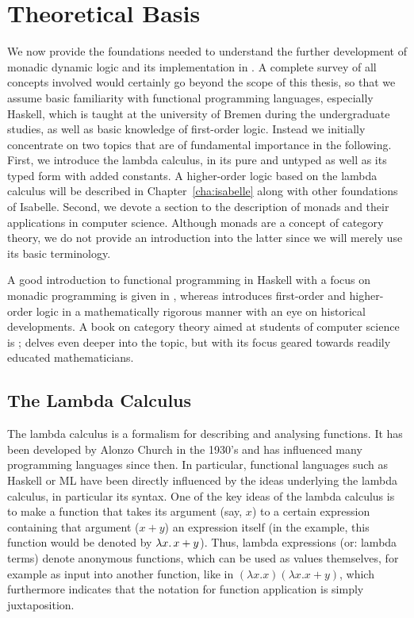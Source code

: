 
\chapter{Theoretical Basis}
\label{cha:theoret-basis}

We now provide the foundations needed to understand the further development of
monadic dynamic logic and its implementation in \IsabelleHOL. A complete survey
of all concepts involved would certainly go beyond the scope of this thesis, so
that we assume basic familiarity with functional programming languages,
especially Haskell, which is taught at the university of Bremen during the
undergraduate studies, as well as basic knowledge of first-order logic. Instead
we initially concentrate on two topics that are of fundamental importance in the
following. First, we introduce the lambda calculus, in its pure and untyped as
well as its typed form with added constants. A higher-order logic based on the
lambda calculus will be described in Chapter~\ref{cha:isabelle} along with
other foundations of Isabelle. Second, we devote a section to the description of
monads and their applications in computer science. Although monads are a concept
of category theory, we do not provide an introduction into the latter since we
will merely use its basic terminology.

A good introduction to functional programming in Haskell with a focus on monadic
programming is given in \cite{Hudak00}, whereas \cite{Andrews00} introduces
first-order and higher-order logic in a mathematically rigorous manner with an
eye on historical developments. A book
on category theory aimed at students of computer science is \cite{Pierce91};
 \cite{MacLane98} delves even deeper into the topic, but with its focus
geared towards readily educated mathematicians.


\section{The Lambda Calculus}
\label{sec:lambda-calculus}

The lambda calculus is a formalism for describing and analysing functions. It
has been developed by Alonzo Church in the 1930's and has influenced many
programming languages since then. In particular, functional languages such as
Haskell or ML have been directly influenced by the ideas underlying the lambda
calculus, in particular its syntax. One of the key ideas of the lambda calculus
is to make a function that takes its argument (say, $x$) to a certain expression
containing that argument (\EG $x+y$) an expression itself (in the example, this
function would be denoted by ${\lambda x.\,x+y}$). Thus, lambda expressions
(or: lambda terms) denote anonymous functions, which can be used as
values themselves, for example as input into another function, like in $(\lambda x. x)
(\lambda x. x+y)$, which furthermore indicates that the notation for function
application is simply juxtaposition.

